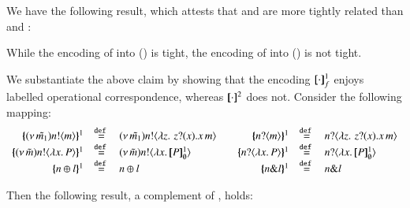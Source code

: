 We have the following result, which attests that 
\HOp and \HO are more tightly related than \HOp and \sessp:
\begin{theorem}\label{t:tight}
While the encoding of \HOp into \HO () is tight, the encoding of \HOp into \sessp () is not tight.
\end{theorem}

\noi We substantiate the above claim by showing that the encoding $[\!\![\cdot]\!\!]^1_f$ enjoys 
labelled operational correspondence, whereas $[\!\![\cdot]\!\!]^2$ does not. 
Consider the following mapping:
\[
	\begin{array}{rclcrcl}
		\mapa{\news{\tilde{m_1}}\bactout{n}{m}}^{1}	&\defeq&	\news{\tilde{m_1}}\bactout{n}{\abs{z}{\,\binp{z}{x} \appl{x}{m}} }
		& &
		\mapa{\bactinp{n}{m}}^{1}			&\defeq&	\bactinp{n}{\abs{z}{\,\binp{z}{x} \appl{x}{m}} }
		\\
		\mapa{\news{\tilde{m}}\bactout{n}{\abs{x}{P}}}^{1} &\defeq& \news{\tilde{m}}\bactout{n}{\abs{x}{\pmapp{P}{1}{\es}}}
		& &
		\mapa{\bactinp{n}{\abs{x}{P}}}^{1} &\defeq& \bactinp{n}{\abs{x}{\pmapp{P}{1}{\es}}}
		\\
		\mapa{\bactsel{n}{l} }^{1} &\defeq& \bactsel{n}{l} 
		& &
		\mapa{\bactbra{n}{l} }^{1} &\defeq& \bactbra{n}{l} 
	\end{array}
\]



Then the following result, a complement of , holds:

